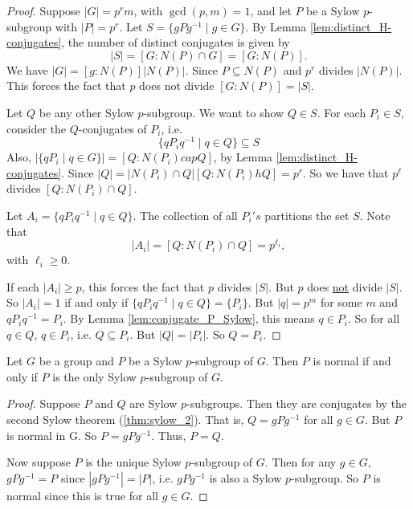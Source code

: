 \begin{proof}
	Suppose $|G|=p^rm$, with $\gcd(p,m)=1$, and let $P$ be a Sylow $p$-subgroup with $|P|=p^r$. Let $S=\{gPg^{-1}\mid g\in G\}$. By Lemma \ref{lem:distinct_H-conjugates}, the number of distinct conjugates is given by
	$$|S|=[G:N(P)\cap G]=[G:N(P)].$$
	We have $|G|=[g:N(P)]|N(P)|$. Since $P\subseteq N(P)$ and $p^r$ divides $|N(P)|$. This forces the fact that $p$ does not divide $[G:N(P)]=|S|$.

	Let $Q$ be any other Sylow $p$-subgroup. We want to show $Q\in S$. For each $P_i\in S$, consider the $Q$-conjugates of $P_i$, i.e.
	$$\{qP_iq^{-1}\mid q\in Q\}\subseteq S$$
	Also, $|\{qP_i\mid q\in G\}|=[Q:N(P_i)cap Q]$, by Lemma \ref{lem:distinct_H-conjugates}. Since $|Q|=|N(P_i)\cap Q|[Q:N(P_i)hQ]=p^r$. So we have that $p^\ell$ divides $[Q:N(P_i)\cap Q]$.

	Let $A_i=\{qP_iq^{-1}\mid q\in Q\}$. The collection of all $P_i's$ partitions the set $S$. Note that
	$$|A_i|=[Q:N(P_i)\cap Q]=p^{\ell_i},$$
	with $\ell_i\geq 0$.

	If each $|A_i|\geq p$, this forces the fact that $p$ divides $|S|$. But $p$ does \underline{not} divide $|S|$. So $|A_i|=1$ if and only if $\{qP_iq^{-1}\mid q\in Q\}=\{P_i\}$. But $|q|=p^m$ for some $m$ and $qP_iq^{-1}=P_i$. By Lemma \ref{lem:conjugate_P_Sylow}, this means $q\in P_i$. So for all $q\in Q$, $q\in P_i$, i.e. $Q\subseteq P_i$. But $|Q|=|P_i|$. So $Q=P_i$.
\end{proof}

\begin{corollary}\label{cor:normal_sylow_p_group}
	Let $G$ be a group and $P$ be a Sylow $p$-subgroup of $G$. Then $P$ is normal if and only if $P$ is the only Sylow $p$-subgroup of $G$.
\end{corollary}

\begin{proof}
	Suppose $P$ and $Q$ are Sylow $p$-subgroups. Then they are conjugates by the second Sylow theorem (\ref{thm:sylow_2}). That is, $Q=gPg^{-1}$ for all $g\in G$. But $P$ is normal in G. So $P=gPg^{-1}$. Thus, $P=Q$.

	Now suppose $P$ is the unique Sylow $p$-subgroup of $G$. Then for any $g\in G$, $gPg^{-1}=P$ since $|gPg^{-1}|=|P|$, i.e. $gPg^{-1}$ is also a Sylow $p$-subgroup. So $P$ is normal since this is true for all $g\in G$.
\end{proof}